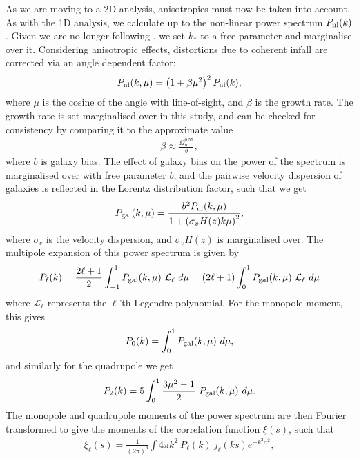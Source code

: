 \documentclass[titlesmallcaps, examinerscopy, copyrightpage]{uqthesis}
\begin{document}
As we are moving to a 2D analysis, anisotropies must now be taken into account. As with the 1D analysis, we calculate up to the non-linear power spectrum $P_{\rm{nl}}(k)$. Given we are no longer following \citet{BlakeDavis2011}, we set $k_*$ to a free parameter and marginalise over it. Considering anisotropic effects, distortions due to coherent infall are corrected via an angle dependent factor:
\begin{align}
P_{\rm{nl}}(k, \mu) = \left(1 + \beta \mu^2\right)^2 P_{\text{nl}}(k),
\end{align}
where $\mu$ is the cosine of the angle with line-of-sight, and $\beta$ is the growth rate. The growth rate is set marginalised over in this study, and can be checked for consistency by comparing it to the approximate value
\begin{align}
\beta \approx \frac{\Omega_m^{0.55}}{b},
\end{align}
where $b$ is galaxy bias. The effect of galaxy bias on the power of the spectrum is marginalised over with free parameter $b$, and the pairwise velocity dispersion of galaxies is reflected in the Lorentz distribution factor, such that we get
\begin{align}
P_{\rm{gal}}(k, \mu) = \frac{b^2 P_{\rm{nl}}(k, \mu)}{1 + \left(\sigma_v H(z) k \mu\right)^2},
\end{align} 
where $\sigma_v$ is the velocity dispersion, and $\sigma_v H(z)$ is marginalised over. The multipole expansion of this power spectrum is given by
\begin{align}
P_{\ell}(k) = \frac{2\ell + 1}{2} \int_{-1}^1 P_{\rm{gal}}(k, \mu) \ \mathcal{L}_\ell \  d\mu = (2\ell + 1) \int_{0}^1 P_{\rm{gal}}(k, \mu) \ \mathcal{L}_\ell \  d\mu
\end{align}
where $\mathcal{L}_\ell$ represents the $\ell$'th Legendre polynomial. For the monopole moment, this gives
\begin{align}
P_0(k) = \int_0^1 P_{\rm{gal}}(k, \mu) \  d\mu,
\end{align}
 and similarly for the quadrupole we get
\begin{align}
P_2(k) = 5 \int_0^1 \frac{3\mu^2 - 1}{2}\  P_{\rm{gal}}(k, \mu)\  d\mu.
\end{align}
The monopole and quadrupole moments of the power spectrum are then Fourier transformed to give the moments of the correlation function $\xi(s)$, such that
\begin{align}
\xi_\ell(s) = \frac{1}{(2\pi)^3} \int 4\pi k^2 \ P_\ell(k) \ j_\ell(ks) e^{-k^2 a^2},
\end{align}
\end{document}
